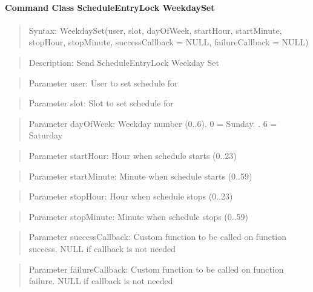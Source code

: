 \paragraph {Command Class ScheduleEntryLock WeekdaySet}
\begin{quote} Syntax: WeekdaySet(user, slot, dayOfWeek, startHour, startMinute, stopHour, stopMinute, successCallback = NULL, failureCallback = NULL)\end{quote}
\begin{quote} Description: Send ScheduleEntryLock Weekday Set\end{quote}
\begin{quote} Parameter user: User to set schedule for\end{quote}
\begin{quote} Parameter slot: Slot to set schedule for\end{quote}
\begin{quote} Parameter dayOfWeek: Weekday number (0..6). 0 = Sunday. . 6 = Saturday\end{quote}
\begin{quote} Parameter startHour: Hour when schedule starts (0..23)\end{quote}
\begin{quote} Parameter startMinute: Minute when schedule starts (0..59)\end{quote}
\begin{quote} Parameter stopHour: Hour when schedule stops (0..23)\end{quote}
\begin{quote} Parameter stopMinute: Minute when schedule stops (0..59)\end{quote}
\begin{quote} Parameter successCallback: Custom function to be called on function success. NULL if callback is not needed\end{quote}
\begin{quote} Parameter failureCallback: Custom function to be called on function failure. NULL if callback is not needed\end{quote}

